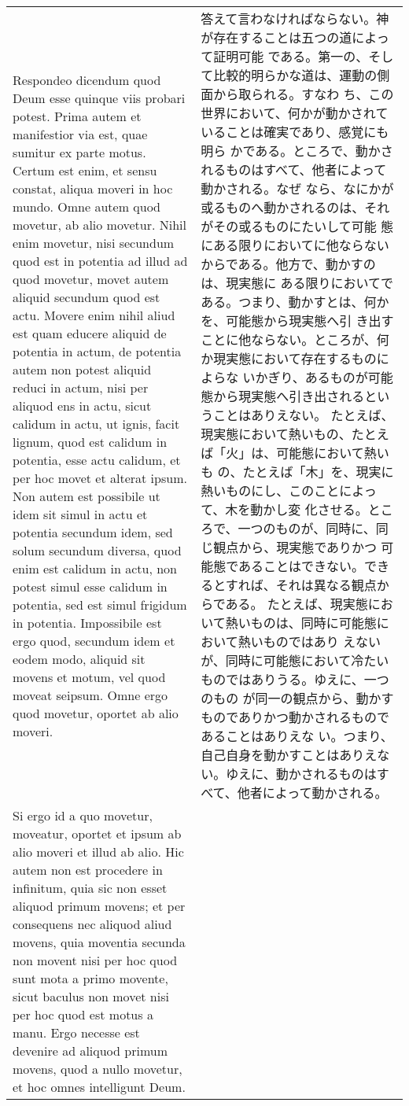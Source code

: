 \documentclass[10pt]{jsarticle} %
\begin{document}
\begin{longtable}{p{21em}p{21em}}
{\sc Respondeo dicendum} quod Deum esse quinque viis
probari potest. Prima autem et manifestior via est, quae sumitur ex
parte motus. Certum est enim, et sensu constat, aliqua moveri in hoc
mundo. Omne autem quod movetur, ab alio movetur. Nihil enim movetur,
nisi secundum quod est in potentia ad illud ad quod movetur, movet autem
aliquid secundum quod est actu. Movere enim nihil aliud est quam educere
aliquid de potentia in actum, de potentia autem non potest aliquid
reduci in actum, nisi per aliquod ens in actu, sicut calidum in actu, ut
ignis, facit lignum, quod est calidum in potentia, esse actu calidum, et
per hoc movet et alterat ipsum. Non autem est possibile ut idem sit
simul in actu et potentia secundum idem, sed solum secundum diversa,
quod enim est calidum in actu, non potest simul esse calidum in
potentia, sed est simul frigidum in potentia. Impossibile est ergo quod,
secundum idem et eodem modo, aliquid sit movens et motum, vel quod
moveat seipsum. Omne ergo quod movetur, oportet ab alio moveri. 

& 

答えて言わなければならない。神が存在することは五つの道によって証明可能
である。第一の、そして比較的明らかな道は、運動の側面から取られる。すなわ
ち、この世界において、何かが動かされていることは確実であり、感覚にも明ら
かである。ところで、動かされるものはすべて、他者によって動かされる。なぜ
なら、なにかが或るものへ動かされるのは、それがその或るものにたいして可能
態にある限りにおいてに他ならないからである。他方で、動かすのは、現実態に
ある限りにおいてである。つまり、動かすとは、何かを、可能態から現実態へ引
き出すことに他ならない。ところが、何か現実態において存在するものによらな
いかぎり、あるものが可能態から現実態へ引き出されるということはありえない。
たとえば、現実態において熱いもの、たとえば「火」は、可能態において熱いも
の、たとえば「木」を、現実に熱いものにし、このことによって、木を動かし変
化させる。ところで、一つのものが、同時に、同じ観点から、現実態でありかつ
可能態であることはできない。できるとすれば、それは異なる観点からである。
たとえば、現実態において熱いものは、同時に可能態において熱いものではあり
えないが、同時に可能態において冷たいものではありうる。ゆえに、一つのもの
が同一の観点から、動かすものでありかつ動かされるものであることはありえな
い。つまり、自己自身を動かすことはありえない。ゆえに、動かされるものはす
べて、他者によって動かされる。

\\

Si ergo
id a quo movetur, moveatur, oportet et ipsum ab alio moveri et illud ab
alio. Hic autem non est procedere in infinitum, quia sic non esset
aliquod primum movens; et per consequens nec aliquod aliud movens, quia
moventia secunda non movent nisi per hoc quod sunt mota a primo movente,
sicut baculus non movet nisi per hoc quod est motus a manu. Ergo necesse
est devenire ad aliquod primum movens, quod a nullo movetur, et hoc
omnes intelligunt Deum. 



\end{longtable}
\end{document}
